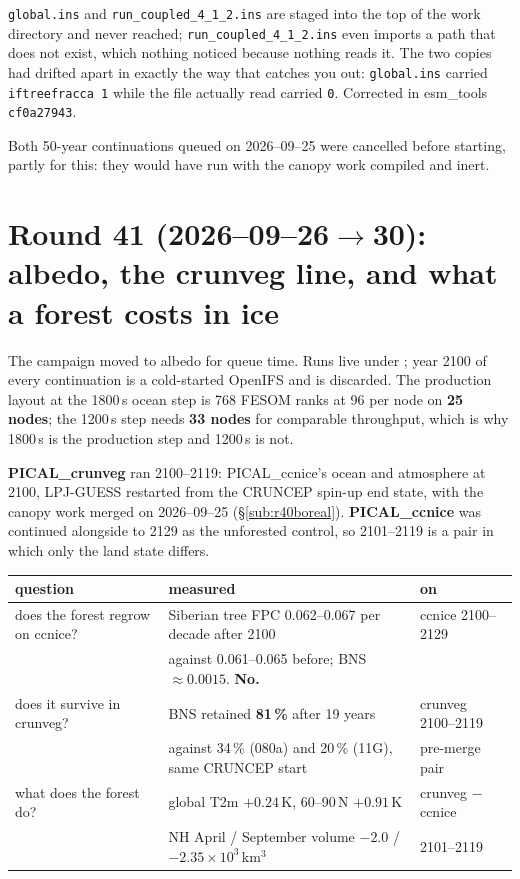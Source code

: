 \documentclass[10pt]{article}
\begin{document}
\texttt{global.ins} and \texttt{run\_coupled\_4\_1\_2.ins} are staged into the top of the work
directory and never reached; \texttt{run\_coupled\_4\_1\_2.ins} even imports a path that does
not exist, which nothing noticed because nothing reads it. The two copies had drifted apart in
exactly the way that catches you out: \texttt{global.ins} carried \texttt{iftreefracca 1} while
the file actually read carried \texttt{0}. Corrected in esm\_tools \texttt{cf0a27943}.

Both 50-year continuations queued on 2026--09--25 were cancelled before starting, partly for
this: they would have run with the canopy work compiled and inert.

\section{Round 41 (2026--09--26$\to$30): albedo, the crunveg line, and what a forest costs in ice}\label{sec:round41}

The campaign moved to albedo for queue time. Runs live under
; year 2100 of every
continuation is a cold-started OpenIFS and is discarded. The production layout at the 1800\,s
ocean step is 768 FESOM ranks at 96 per node on \textbf{25 nodes}; the 1200\,s step needs
\textbf{33 nodes} for comparable throughput, which is why 1800\,s is the production step and
1200\,s is not.

\textbf{PICAL\_crunveg} ran 2100--2119: PICAL\_ccnice's ocean and atmosphere at 2100, LPJ-GUESS
restarted from the CRUNCEP spin-up end state, with the canopy work merged on 2026--09--25
(\S\ref{sub:r40boreal}). \textbf{PICAL\_ccnice} was continued alongside to 2129 as the unforested
control, so 2101--2119 is a pair in which only the land state differs.

\begin{center}\small
\begin{tabular}{lll}
\toprule
question & measured & on \\
\midrule
does the forest regrow on ccnice? & Siberian tree FPC 0.062--0.067 per decade after 2100 & ccnice 2100--2129 \\
 & against 0.061--0.065 before; BNS ${\approx}0.0015$. \textbf{No.} & \\
does it survive in crunveg? & BNS retained \textbf{81\,\%} after 19 years & crunveg 2100--2119 \\
 & against 34\,\% (080a) and 20\,\% (11G), same CRUNCEP start & pre-merge pair \\
what does the forest do? & global T2m $+0.24$\,K, 60--90\,N $+0.91$\,K & crunveg $-$ ccnice \\
 & NH April / September volume $-2.0$ / $-2.35\times10^3$\,km$^3$ & 2101--2119 \\
\bottomrule
\end{tabular}
\end{center}
\end{document}
